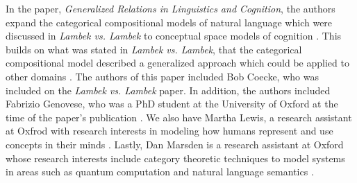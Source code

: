 \documentclass[11pt, reqno]{amsart}
\theoremstyle{plain}
\theoremstyle{definition}
\theoremstyle{example}
\begin{document}
\par
In the paper, \textit{Generalized Relations in Linguistics and Cognition}, the authors expand the categorical compositional models of natural language which were discussed in \textit{Lambek vs. Lambek} to conceptual space models of cognition \cite{relations}. This builds on what was stated in \textit{Lambek vs. Lambek}, that the categorical compositional model described a generalized approach which could be applied to other domains \cite{lambekvlambek}. The authors of this paper included Bob Coecke, who was included on the \textit{Lambek vs. Lambek} paper. In addition, the authors included Fabrizio Genovese, who was a PhD student at the University of Oxford at the time of the paper's publication \cite{genovese}. We also have Martha Lewis, a research assistant at Oxfrod with research interests in modeling how humans represent and use concepts in their minds \cite{lewis}. Lastly, Dan Marsden is a research assistant at Oxford whose research interests include category theoretic techniques to model systems in areas such as quantum computation and natural language semantics \cite{marsden}.
\end{document}

